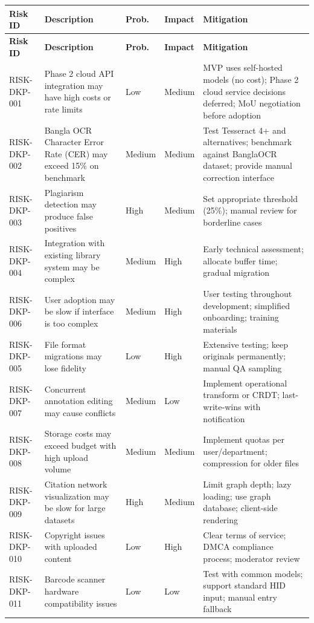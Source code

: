 \documentclass[12pt,a4paper]{report}
\begin{document}
\begin{longtable}{|p{2cm}|p{4.5cm}|p{1.5cm}|p{1.5cm}|p{4cm}|}
\hline
\textbf{Risk ID} & \textbf{Description} & \textbf{Prob.} & \textbf{Impact} & \textbf{Mitigation} \\ \hline
\endfirsthead
\hline
\textbf{Risk ID} & \textbf{Description} & \textbf{Prob.} & \textbf{Impact} & \textbf{Mitigation} \\ \hline
\endhead
RISK-DKP-001 & Phase 2 cloud API integration may have high costs or rate limits & Low & Medium & MVP uses self-hosted models (no cost); Phase 2 cloud service decisions deferred; MoU negotiation before adoption \\ \hline
RISK-DKP-002 & Bangla OCR Character Error Rate (CER) may exceed 15\% on benchmark & Medium & Medium & Test Tesseract 4+ and alternatives; benchmark against BanglaOCR dataset; provide manual correction interface \\ \hline
RISK-DKP-003 & Plagiarism detection may produce false positives & High & Medium & Set appropriate threshold (25\%); manual review for borderline cases \\ \hline
RISK-DKP-004 & Integration with existing library system may be complex & Medium & High & Early technical assessment; allocate buffer time; gradual migration \\ \hline
RISK-DKP-006 & User adoption may be slow if interface is too complex & Medium & High & User testing throughout development; simplified onboarding; training materials \\ \hline
RISK-DKP-005 & File format migrations may lose fidelity & Low & High & Extensive testing; keep originals permanently; manual QA sampling \\ \hline
RISK-DKP-007 & Concurrent annotation editing may cause conflicts & Medium & Low & Implement operational transform or CRDT; last-write-wins with notification \\ \hline
RISK-DKP-008 & Storage costs may exceed budget with high upload volume & Medium & Medium & Implement quotas per user/department; compression for older files \\ \hline
RISK-DKP-009 & Citation network visualization may be slow for large datasets & High & Medium & Limit graph depth; lazy loading; use graph database; client-side rendering \\ \hline
RISK-DKP-010 & Copyright issues with uploaded content & Low & High & Clear terms of service; DMCA compliance process; moderator review \\ \hline
RISK-DKP-011 & Barcode scanner hardware compatibility issues & Low & Low & Test with common models; support standard HID input; manual entry fallback \\ \hline

\end{longtable}
\end{document}
